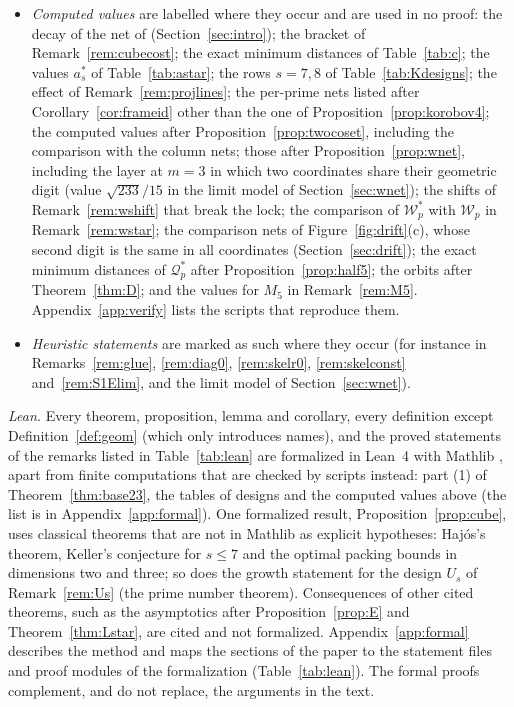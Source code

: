 \documentclass[11pt]{amsart}
\theoremstyle{definition}
\theoremstyle{plain}
\begin{document}
\begin{itemize}
\item \emph{Computed values} are labelled where they occur and are used in no proof: the decay of the net of \cite{GK09} (Section~\ref{sec:intro}); the bracket of Remark~\ref{rem:cubecost}; the exact minimum distances of Table~\ref{tab:c}; the values $a^*_s$ of Table~\ref{tab:astar}; the rows $s=7,8$ of Table~\ref{tab:Kdesigns}; the effect of Remark~\ref{rem:projlines}; the per-prime nets listed after Corollary~\ref{cor:frameid} other than the one of Proposition~\ref{prop:korobov4}; the computed values after Proposition~\ref{prop:twocoset}, including the comparison with the column nets; those after Proposition~\ref{prop:wnet}, including the layer at $m=3$ in which two coordinates share their geometric digit (value $\sqrt{233}/15$ in the limit model of Section~\ref{sec:wnet}); the shifts of Remark~\ref{rem:wshift} that break the lock; the comparison of $\mathcal W^*_p$ with $\mathcal W_p$ in Remark~\ref{rem:wstar}; the comparison nets of Figure~\ref{fig:drift}(c), whose second digit is the same in all coordinates (Section~\ref{sec:drift}); the exact minimum distances of $\mathcal Q^*_p$ after Proposition~\ref{prop:half5}; the orbits after Theorem~\ref{thm:D}; and the values for $M_5$ in Remark~\ref{rem:M5}. Appendix~\ref{app:verify} lists the scripts that reproduce them.
\item \emph{Heuristic statements} are marked as such where they occur (for instance in Remarks~\ref{rem:glue}, \ref{rem:diag0}, \ref{rem:skelr0}, \ref{rem:skelconst} and~\ref{rem:S1Elim}, and the limit model of Section~\ref{sec:wnet}).
\end{itemize}

\emph{Lean.} Every theorem, proposition, lemma and corollary, every definition except Definition~\ref{def:geom} (which only introduces names), and the proved statements of the remarks listed in Table~\ref{tab:lean} are formalized in Lean~4 \cite{dMU21} with Mathlib \cite{Mathlib20}, apart from finite computations that are checked by scripts instead: part (1) of Theorem~\ref{thm:base23}, the tables of designs and the computed values above (the list is in Appendix~\ref{app:formal}). One formalized result, Proposition~\ref{prop:cube}, uses classical theorems that are not in Mathlib as explicit hypotheses: Haj\'os's theorem, Keller's conjecture for $s\le7$ and the optimal packing bounds in dimensions two and three; so does the growth statement for the design $U_s$ of Remark~\ref{rem:Us} (the prime number theorem). Consequences of other cited theorems, such as the asymptotics after Proposition~\ref{prop:E} and Theorem~\ref{thm:Lstar}, are cited and not formalized. Appendix~\ref{app:formal} describes the method and maps the sections of the paper to the statement files and proof modules of the formalization (Table~\ref{tab:lean}). The formal proofs complement, and do not replace, the arguments in the text.
\end{document}
